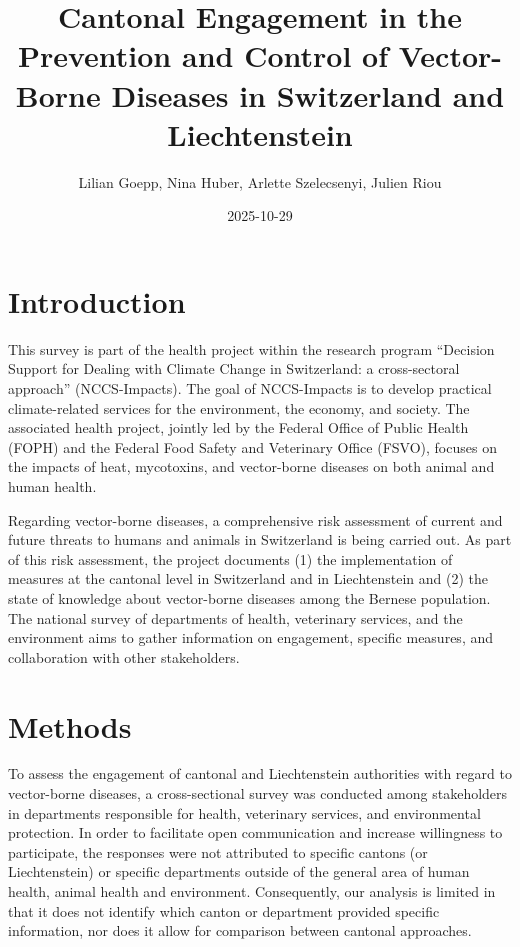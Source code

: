 \documentclass[
  11pt,
]{article}
\title{Cantonal Engagement in the Prevention and Control of Vector-Borne
Diseases in Switzerland and Liechtenstein}
\author{Lilian Goepp, Nina Huber, Arlette Szelecsenyi, Julien Riou}
\date{2025-10-29}
\begin{document}
\maketitle

{
\setcounter{tocdepth}{2}
\tableofcontents
}
\section{Introduction}\label{introduction}

This survey is part of the health project within the research program
``Decision Support for Dealing with Climate Change in Switzerland: a
cross-sectoral approach'' (NCCS-Impacts). The goal of NCCS-Impacts is to
develop practical climate-related services for the environment, the
economy, and society. The associated health project, jointly led by the
Federal Office of Public Health (FOPH) and the Federal Food Safety and
Veterinary Office (FSVO), focuses on the impacts of heat, mycotoxins,
and vector-borne diseases on both animal and human health.

Regarding vector-borne diseases, a comprehensive risk assessment of
current and future threats to humans and animals in Switzerland is being
carried out. As part of this risk assessment, the project documents (1)
the implementation of measures at the cantonal level in Switzerland and
in Liechtenstein and (2) the state of knowledge about vector-borne
diseases among the Bernese population. The national survey of
departments of health, veterinary services, and the environment aims to
gather information on engagement, specific measures, and collaboration
with other stakeholders.

\section{Methods}\label{methods}

To assess the engagement of cantonal and Liechtenstein authorities with
regard to vector-borne diseases, a cross-sectional survey was conducted
among stakeholders in departments responsible for health, veterinary
services, and environmental protection. In order to facilitate open
communication and increase willingness to participate, the responses
were not attributed to specific cantons (or Liechtenstein) or specific
departments outside of the general area of human health, animal health
and environment. Consequently, our analysis is limited in that it does
not identify which canton or department provided specific information,
nor does it allow for comparison between cantonal approaches.
\end{document}
